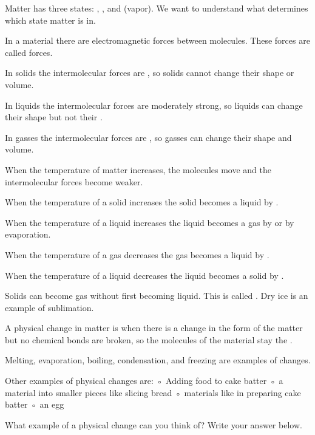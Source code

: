 \documentclass[answers,12pt]{exam}
\begin{document}
\begin{questions}
  
  \question Matter has three states: \fillin, \fillin, and \fillin (vapor).  We want to understand what determines which state matter is in.

  \question In a material there are electromagnetic forces between molecules.  These forces are called \fillin forces.
  
  \question In solids the intermolecular forces are \fillin, so solids cannot change their shape or volume.
  
  \question In liquids the intermolecular forces are moderately strong, so liquids can change their shape but not their \fillin.
  
  \question In gasses the intermolecular forces are \fillin, so gasses can change their shape and volume.
  
  \question When the temperature of matter increases, the molecules move \fillin and the intermolecular forces become weaker.
  
  \question When the temperature of a solid increases the solid becomes a liquid by \fillin.  
  
  \question When the temperature of a liquid increases the liquid becomes a gas by \fillin or by evaporation.
  
  \question When the temperature of a gas decreases the gas becomes a liquid by \fillin.
  
  \question When the temperature of a liquid decreases the liquid becomes a solid by \fillin.
  
  \question Solids can become gas without first becoming liquid.  This is called \fillin.  Dry ice is an example of sublimation.
  
  \question A physical change in matter is when there is a change in the form of the matter but no chemical bonds are broken, so the molecules of the material stay the \fillin.
  
  \question Melting, evaporation, boiling, condensation, and freezing are examples of \fillin changes.
  
  \question Other examples of physical changes are:
      ◦ Adding food \fillin to cake batter
      ◦ \fillin a material into smaller pieces like slicing bread
      ◦ \fillin materials like in preparing cake batter
      ◦ \fillin an egg

  \question What example of a physical change can you think of?  Write your answer below.



\end{questions}
\end{document}
